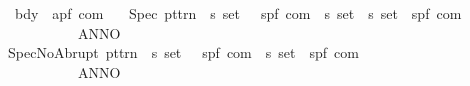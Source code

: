 \begin{isabellebody}
\ \ {\isachardoublequoteopen}{\isachardoublequoteclose}{\isacharcolon}{\isacharcolon}\ {\isachardoublequoteopen}bdy\ {\isasymRightarrow}\ {\isacharparenleft}{\isacharprime}a{\isacharcomma}{\isacharprime}p{\isacharcomma}{\isacharprime}f{\isacharparenright}\ com{\isachardoublequoteclose}\ {\isacharparenleft}{\isachardoublequoteopen}{\isacharunderscore}{\isachardoublequoteclose}{\isacharparenright}\isanewline
\ \ {\isachardoublequoteopen}{\isacharunderscore}Spec{\isachardoublequoteclose}{\isacharcolon}{\isacharcolon}\ {\isachardoublequoteopen}pttrn\ {\isasymRightarrow}\ {\isacharprime}s\ set\ {\isasymRightarrow}\ \ {\isacharparenleft}{\isacharprime}s{\isacharcomma}{\isacharprime}p{\isacharcomma}{\isacharprime}f{\isacharparenright}\ com\ {\isasymRightarrow}\ {\isacharprime}s\ set\ {\isasymRightarrow}\ {\isacharprime}s\ set\ {\isasymRightarrow}\ {\isacharparenleft}{\isacharprime}s{\isacharcomma}{\isacharprime}p{\isacharcomma}{\isacharprime}f{\isacharparenright}\ com{\isachardoublequoteclose}\isanewline
\ \ \ \ \ \ \ \ \ \ \ \ {\isacharparenleft}{\isachardoublequoteopen}{\isacharparenleft}ANNO\ {\isacharunderscore}{\isachardot}\ {\isacharunderscore}{\isacharslash}\ {\isacharparenleft}{\isacharunderscore}{\isacharparenright}{\isacharslash}\ {\isacharunderscore}{\isacharcomma}{\isacharslash}{\isacharunderscore}{\isacharparenright}{\isachardoublequoteclose}\ {\isacharbrackleft}{}{\isacharcomma}{}{}{}{}{\isacharcomma}{}{}{\isacharcomma}{}{}{}{}{\isacharcomma}{}{}{}{}{\isacharbrackright}\ {}{}{\isacharparenright}\isanewline
\ \ {\isachardoublequoteopen}{\isacharunderscore}SpecNoAbrupt{\isachardoublequoteclose}{\isacharcolon}{\isacharcolon}\ {\isachardoublequoteopen}pttrn\ {\isasymRightarrow}\ {\isacharprime}s\ set\ {\isasymRightarrow}\ \ {\isacharparenleft}{\isacharprime}s{\isacharcomma}{\isacharprime}p{\isacharcomma}{\isacharprime}f{\isacharparenright}\ com\ {\isasymRightarrow}\ {\isacharprime}s\ set\ {\isasymRightarrow}\ {\isacharparenleft}{\isacharprime}s{\isacharcomma}{\isacharprime}p{\isacharcomma}{\isacharprime}f{\isacharparenright}\ com{\isachardoublequoteclose}\isanewline
\ \ \ \ \ \ \ \ \ \ \ \ {\isacharparenleft}{\isachardoublequoteopen}{\isacharparenleft}ANNO\ {\isacharunderscore}{\isachardot}\ {\isacharunderscore}{\isacharslash}\ {\isacharparenleft}{\isacharunderscore}{\isacharparenright}{\isacharslash}\ {\isacharunderscore}{\isacharparenright}{\isachardoublequoteclose}\ {\isacharbrackleft}{}{\isacharcomma}{}{}{}{}{\isacharcomma}{}{}{\isacharcomma}{}{}{}{}{\isacharbrackright}\ {}{}{\isacharparenright}\isanewline

\end{isabellebody}
